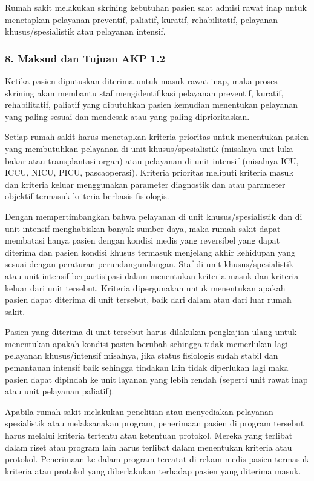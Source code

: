 \documentclass[
]{book}
\begin{document}
Rumah sakit melakukan skrining kebutuhan pasien saat admisi rawat inap untuk menetapkan pelayanan preventif, paliatif, kuratif, rehabilitatif, pelayanan khusus/spesialistik atau pelayanan intensif.

\hypertarget{maksud-dan-tujuan-akp-1.2}{%
\subsubsection*{8. Maksud dan Tujuan AKP 1.2}\label{maksud-dan-tujuan-akp-1.2}}

Ketika pasien diputuskan diterima untuk masuk rawat inap, maka proses skrining akan membantu staf mengidentifikasi pelayanan preventif, kuratif, rehabilitatif, paliatif yang dibutuhkan pasien kemudian menentukan pelayanan yang paling sesuai dan mendesak atau yang paling diprioritaskan.

Setiap rumah sakit harus menetapkan kriteria prioritas untuk menentukan pasien yang membutuhkan pelayanan di unit khusus/spesialistik (misalnya unit luka bakar atau transplantasi organ) atau pelayanan di unit intensif (misalnya ICU, ICCU, NICU, PICU, pascaoperasi). Kriteria prioritas meliputi kriteria masuk dan kriteria keluar menggunakan parameter diagnostik dan atau parameter objektif termasuk kriteria berbasis fisiologis.

Dengan mempertimbangkan bahwa pelayanan di unit khusus/spesialistik dan di unit intensif menghabiskan banyak sumber daya, maka rumah sakit dapat membatasi hanya pasien dengan kondisi medis yang reversibel yang dapat diterima dan pasien kondisi khusus termasuk menjelang akhir kehidupan yang sesuai dengan peraturan perundangundangan.
Staf di unit khusus/spesialistik atau unit intensif berpartisipasi dalam menentukan kriteria masuk dan kriteria keluar dari unit tersebut. Kriteria dipergunakan untuk menentukan apakah pasien dapat diterima di unit tersebut, baik dari dalam atau dari luar rumah sakit.

Pasien yang diterima di unit tersebut harus dilakukan pengkajian ulang untuk menentukan apakah kondisi pasien berubah sehingga tidak memerlukan lagi pelayanan khusus/intensif misalnya, jika status fisiologis sudah stabil dan pemantauan intensif baik sehingga tindakan lain tidak diperlukan lagi maka pasien dapat dipindah ke unit layanan yang lebih rendah (seperti unit rawat inap atau unit pelayanan paliatif).

Apabila rumah sakit melakukan penelitian atau menyediakan pelayanan spesialistik atau melaksanakan program, penerimaan pasien di program tersebut harus melalui kriteria tertentu atau ketentuan protokol. Mereka yang terlibat dalam riset atau program lain harus terlibat dalam menentukan kriteria atau protokol. Penerimaan ke dalam program tercatat di rekam medis pasien termasuk kriteria atau protokol yang diberlakukan terhadap pasien yang diterima masuk.
\end{document}
